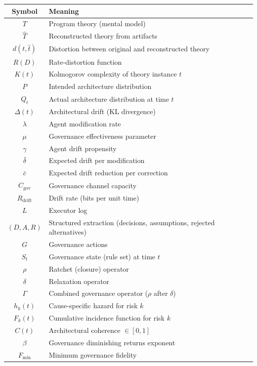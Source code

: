 \documentclass[11pt, a4paper, logo, copyright]{googledeepmind}
\begin{document}
\begin{center}
\begin{tabular}{cl}
\toprule
Symbol & Meaning \\
\midrule
$T$ & Program theory (mental model) \\
$\hat{T}$ & Reconstructed theory from artifacts \\
$d(t, \hat{t})$ & Distortion between original and reconstructed theory \\
$R(D)$ & Rate-distortion function \\
$K(t)$ & Kolmogorov complexity of theory instance $t$ \\
$P$ & Intended architecture distribution \\
$Q_t$ & Actual architecture distribution at time $t$ \\
$\Delta(t)$ & Architectural drift (KL divergence) \\
$\lambda$ & Agent modification rate \\
$\mu$ & Governance effectiveness parameter \\
$\gamma$ & Agent drift propensity \\
$\bar{\delta}$ & Expected drift per modification \\
$\bar{c}$ & Expected drift reduction per correction \\
$C_{\mathrm{gov}}$ & Governance channel capacity \\
$R_{\mathrm{drift}}$ & Drift rate (bits per unit time) \\
$L$ & Executor log \\
$(D, A, R)$ & Structured extraction (decisions, assumptions, rejected alternatives) \\
$G$ & Governance actions \\
$S_t$ & Governance state (rule set) at time $t$ \\
$\rho$ & Ratchet (closure) operator \\
$\delta$ & Relaxation operator \\
$\Gamma$ & Combined governance operator ($\rho$ after $\delta$) \\
$h_k(t)$ & Cause-specific hazard for risk $k$ \\
$F_k(t)$ & Cumulative incidence function for risk $k$ \\
$C(t)$ & Architectural coherence $\in [0,1]$ \\
$\beta$ & Governance diminishing returns exponent \\
$F_{\min}$ & Minimum governance fidelity \\
\bottomrule
\end{tabular}
\end{center}
\end{document}

